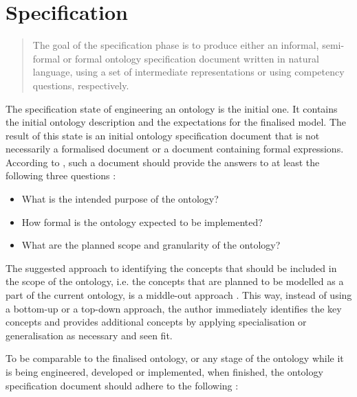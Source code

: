 \chapter{Specification}\label{ch:Specification}

\blockquote[{{\hfill\cite[p. 2]{fernandez-lopez1997METHONTOLOGYOntologicalArt}}}]{The goal of the specification phase is to produce either an informal, semi-formal or formal ontology specification document written in natural language, using a set of intermediate representations or using competency questions, respectively.}

The specification state of engineering an ontology is the initial one. It contains the initial ontology description and the expectations for the finalised model. The result of this state is an initial ontology specification document that is not necessarily a formalised document or a document containing formal expressions. According to \citeauthor{fernandez-lopez1997METHONTOLOGYOntologicalArt}, such a document should provide the answers to at least the following three questions
\cite{fernandez-lopez1997METHONTOLOGYOntologicalArt}%
:

\begin{itemize}
    \item What is the intended purpose of the ontology?
    \item How formal is the ontology expected to be implemented?
    \item What are the planned scope and granularity of the ontology?
\end{itemize}

The suggested approach to identifying the concepts that should be included in the scope of the ontology, i.e. the concepts that are planned to be modelled as a part of the current ontology, is a middle-out approach \cite{fernandez-lopez1997METHONTOLOGYOntologicalArt,uschold1996OntologiesPrinciplesMethods}. This way, instead of using a bottom-up or a top-down approach, the author immediately identifies the key concepts and provides additional concepts by applying specialisation or generalisation as necessary and seen fit.

To be comparable to the finalised ontology, or any stage of the ontology while it is being engineered, developed or implemented, when finished, the ontology specification document should adhere to the following
\cite{fernandez-lopez1997METHONTOLOGYOntologicalArt}%
:

